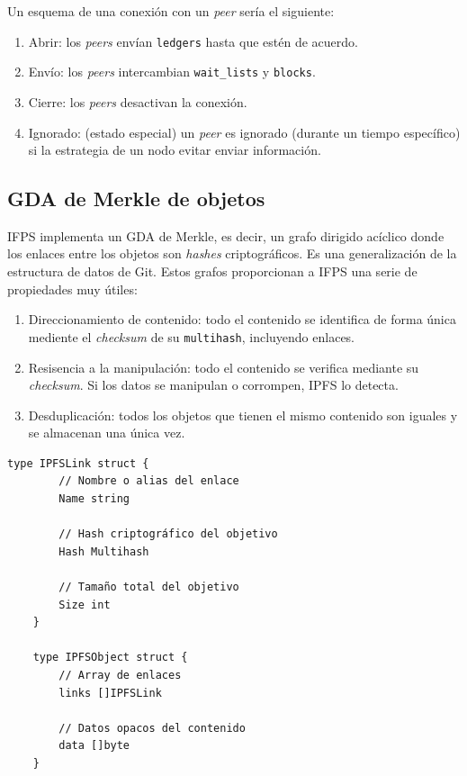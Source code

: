 \documentclass[12pt]{article} %
\begin{document}
Un esquema de una conexión con un \textit{peer} sería el siguiente:
\begin{enumerate}
	\item Abrir: los \textit{peers} envían \texttt{ledgers} hasta que estén de acuerdo.
	\item Envío: los \textit{peers} intercambian \texttt{wait\_lists} y \texttt{blocks}.
	\item Cierre: los \textit{peers} desactivan la conexión.
	\item Ignorado: (estado especial) un \textit{peer} es ignorado (durante un tiempo específico) si la estrategia de un nodo evitar enviar información.
\end{enumerate}




\subsection{GDA de Merkle de objetos} %
\label{sub:grafo_dirigido_acíclico_de_merkle_de_objetos}

IFPS implementa un GDA de Merkle, es decir, un grafo dirigido acíclico donde los enlaces entre los objetos son \textit{hashes} criptográficos. Es una generalización de la estructura de datos de Git. Estos grafos proporcionan a IFPS una serie de propiedades muy útiles:
\begin{enumerate}
	\item Direccionamiento de contenido: todo el contenido se identifica de forma única mediente el \textit{checksum} de su \texttt{multihash}, incluyendo enlaces.
	\item Resisencia a la manipulación: todo el contenido se verifica mediante su \textit{checksum}. Si los datos se manipulan o corrompen, IPFS lo detecta.
	\item Desduplicación: todos los objetos que tienen el mismo contenido son iguales y se almacenan una única vez.
\end{enumerate}

\begin{lstlisting}[caption={Implementación de los objetos IPFS.}, language=Golang]
	type IPFSLink struct {
		// Nombre o alias del enlace
		Name string

		// Hash criptográfico del objetivo
		Hash Multihash

		// Tamaño total del objetivo
		Size int
	}

	type IPFSObject struct {
		// Array de enlaces
		links []IPFSLink

		// Datos opacos del contenido
		data []byte
	}
\end{lstlisting}
\end{document}
